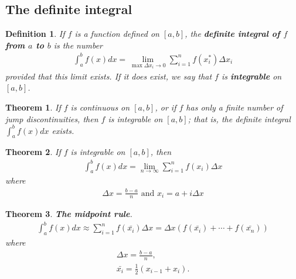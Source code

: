 \documentclass{article}
\theoremstyle{sltheorem}
\newtheorem{definition}{Definition}[section]
\newtheorem{theorem}{Theorem}[section]
\begin{document}
\subsection{The definite integral}
\begin{definition}
    If $f$ is a function defined on $[a,b]$, the \textbf{definite integral of $f$ from $a$ to $b$} is the number
    \begin{align*}
        \int_a^b f(x)dx=\lim_{\max \Delta x_i\to0}\sum_{i=1}^n f(x_i^*)\Delta x_i
    \end{align*}
    provided that this limit exists. If it does exist, we say that $f$ is \textbf{integrable} on $[a,b]$.
\end{definition}
\begin{theorem}
    If $f$ is continuous on $[a,b]$, or if $f$ has only a finite number of jump discontinuities, then $f$ is integrable on $[a,b]$; that is, the definite integral $\int_a^b f(x)dx$ exists.
\end{theorem}
\begin{theorem}
    If $f$ is integrable on $[a,b]$, then \begin{align*}
        \int_a^b f(x)dx = \lim_{n\to\infty}\sum_{i=1}^nf(x_i)\Delta x
    \end{align*}
    where \begin{align*}
    \Delta x = \frac{b-a}{n} \text{ and } x_i=a+i\Delta x
    \end{align*}
\end{theorem}
\begin{theorem}
    \textbf{The midpoint rule}.
    \begin{align*}
        \int_a^bf(x)dx \approx \sum_{i=1}^nf(\bar{x_i})\Delta x = \Delta x (f(\bar{x_i})+\cdots+f(\bar{x_n}))
    \end{align*}
    where
    \begin{align*}
        \Delta x = \frac{b-a}{n},\\
        \bar{x_i} = \frac{1}{2}(x_{i-1}+x_i).
    \end{align*}
\end{theorem}
\end{document}
